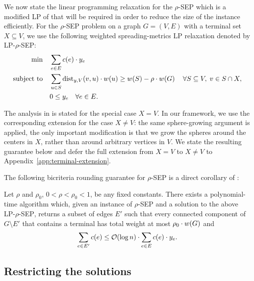     We now state the linear programming relaxation for the \textsc{$\rho$-SEP} which is a modified LP of \cite{FastApproximateGraphPartitioningAlgorithms} that will be required in order to reduce the size of the instance efficiently. For the \textsc{$\rho$-SEP} problem on a graph $G=(V,E)$ with a terminal set $X\subseteq V$, we use the following weighted spreading-metrics \textsc{LP} relaxation denoted by \textsc{LP-$\rho$-SEP}:
    \begin{align}
        \min \quad &\sum_{e\in E} c(e)\cdot y_e\\
        \text{subject to} \quad &\sum_{u\in S} \text{dist}_{y,V}(v,u)\cdot w(u) \geq w\mathopen{}\left( S \right)-\rho\cdot w\mathopen{}\left( G \right) \quad \forall S\subseteq V,\; v\in S\cap X,\\
        &0\leq y_e\quad \forall e\in E.
    \end{align}

    The analysis in \cite{FastApproximateGraphPartitioningAlgorithms} is stated for the special case $X=V$. In our framework, we use the corresponding extension for the case $X\neq V$: the same sphere-growing argument is applied, the only important modification is that we grow the spheres around the centers in $X$, rather than around arbitrary vertices in $V$. We state the resulting guarantee below and defer the full extension from $X=V$ to $X\neq V$ to Appendix~\ref{app:terminal-extension}.

    The following bicriteria rounding guarantee for \textsc{$\rho$-SEP} is a direct corollary of \cite{FastApproximateGraphPartitioningAlgorithms}:
    \begin{theorem}\label{thm:ksep-rounding}
        Let $\rho$ and $\rho_0$, $0<\rho<\rho_0<1$, be any fixed constants.
        There exists a polynomial-time algorithm which, given an instance of \textsc{$\rho$-SEP} and a solution to the above \textsc{LP-$\rho$-SEP}, returns a subset of edges $E'$ such that every connected component of $G\setminus E'$ that contains a terminal has total weight at most $\rho_0\cdot w\mathopen{}\left( G \right)$ and
        \[
            \sum_{e\in E'} c\mathopen{}\left( e \right) \leq \mathcal{O}\mathopen{}\left( \log n \right)\cdot \sum_{e\in E} c(e)\cdot y_e.
        \]
    \end{theorem}

\subsection{Restricting the solutions}
    
